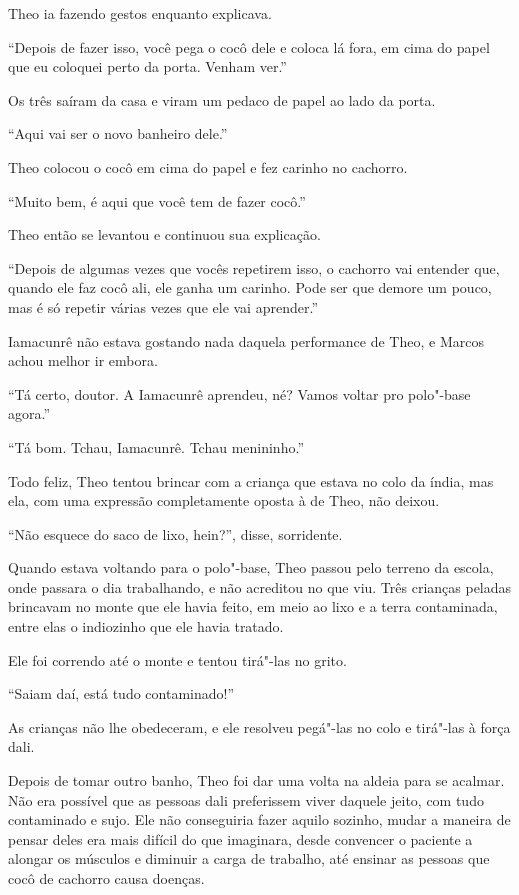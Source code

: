 Theo ia fazendo gestos enquanto explicava.

``Depois de fazer isso, você pega o cocô dele e coloca lá fora, em cima
do papel que eu coloquei perto da porta. Venham ver.''

Os três saíram da casa e viram um pedaco de papel ao lado da porta.

``Aqui vai ser o novo banheiro dele.''

Theo colocou o cocô em cima do papel e fez carinho no cachorro.

``Muito bem, é aqui que você tem de fazer cocô.''

Theo então se levantou e continuou sua explicação.

``Depois de algumas vezes que vocês repetirem isso, o cachorro vai
entender que, quando ele faz cocô ali, ele ganha um carinho. Pode ser
que demore um pouco, mas é só repetir várias vezes que ele vai
aprender.''

Iamacunrê não estava gostando nada daquela performance de Theo, e Marcos
achou melhor ir embora.

``Tá certo, doutor. A Iamacunrê aprendeu, né? Vamos voltar pro polo"-base
agora.''

``Tá bom. Tchau, Iamacunrê. Tchau menininho.''

Todo feliz, Theo tentou brincar com a criança que estava no colo da
índia, mas ela, com uma expressão completamente oposta à de Theo, não
deixou.

``Não esquece do saco de lixo, hein?'', disse, sorridente.

Quando estava voltando para o polo"-base, Theo passou pelo terreno da
escola, onde passara o dia trabalhando, e não acreditou no que viu. Três
crianças peladas brincavam no monte que ele havia feito, em meio ao lixo
e a terra contaminada, entre elas o indiozinho que ele havia tratado.

Ele foi correndo até o monte e tentou tirá"-las no grito.

``Saiam daí, está tudo contaminado!''

As crianças não lhe obedeceram, e ele resolveu pegá"-las no colo e
tirá"-las à força dali.

\asterisc


Depois de tomar outro banho, Theo foi dar uma volta na aldeia para se
acalmar. Não era possível que as pessoas dali preferissem viver daquele
jeito, com tudo contaminado e sujo. Ele não conseguiria fazer aquilo
sozinho, mudar a maneira de pensar deles era mais difícil do que imaginara,
desde convencer o paciente a alongar os músculos e diminuir a carga de
trabalho, até ensinar as pessoas que cocô de cachorro causa doenças.

